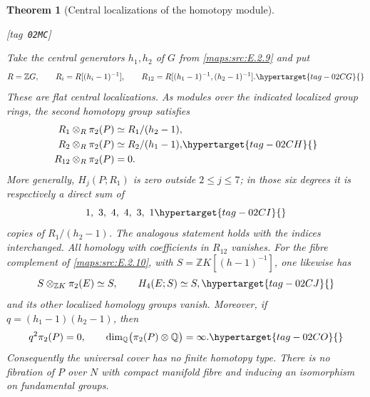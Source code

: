 \documentclass[11pt,a4paper]{article}
\numberwithin{equation}{section}
\newtheorem{theorem}{Theorem}[section]
\theoremstyle{definition}
\newcommand{\StatementRecord}[4]{{\upshape\footnotesize[tag~\texttt{#3}]}\enspace\ignorespaces}
\begin{document}
\begin{theorem}[Central localizations of the homotopy module]\hypertarget{tag-02MC}{}\label{maps:src:E.2.12}
\StatementRecord{maps:src:E.2.12}{proved}{02MC}{\cref{maps:src:E.2.9}, \cref{maps:src:E.2.10}, \eqref{maps:eq:E.S17}, \cref{maps:src:E.2.3}, \eqref{maps:eq:E.S19}, \eqref{maps:eq:E.S21}, \cref{maps:src:E.2.11}}


Take the central generators $h_1,h_2$ of $G$ from \ref{maps:src:E.2.9} and put
\begin{equation}
 R=\mathbb ZG,\qquad R_i=R[(h_i-1)^{-1}],\qquad
              R_{12}=R[(h_1-1)^{-1},(h_2-1)^{-1}].
 \hypertarget{tag-02CG}{}\label{maps:eq:E.S13}
\end{equation}
These are flat central localizations. As modules over the indicated
localized group rings, the second homotopy group satisfies
\begin{equation}
 \begin{split}
 R_1\otimes_R\pi_2(P)&\simeq R_1/(h_2-1),\\
 R_2\otimes_R\pi_2(P)&\simeq R_2/(h_1-1),\\
 R_{12}\otimes_R\pi_2(P)&=0.
 \end{split}
 \hypertarget{tag-02CH}{}\label{maps:eq:E.S14}
\end{equation}
More generally, $H_j(P;R_1)$ is zero outside $2\leq j\leq7$;
in those six degrees it is respectively a direct sum of
\begin{equation}
                  1,\ 3,\ 4,\ 4,\ 3,\ 1
 \hypertarget{tag-02CI}{}\label{maps:eq:E.S15}
\end{equation}
copies of $R_1/(h_2-1)$. The analogous statement holds with the
indices interchanged. All homology with coefficients in $R_{12}$
vanishes. For the fibre complement of \ref{maps:src:E.2.10}, with
$S=\mathbb ZK[(h-1)^{-1}]$, one likewise has
\begin{equation}
             S\otimes_{\mathbb ZK}\pi_2(E)\simeq S,
       \qquad H_4(E;S)\simeq S,
 \hypertarget{tag-02CJ}{}\label{maps:eq:E.S16}
\end{equation}
and its other localized homology groups vanish. Moreover, if
$q=(h_1-1)(h_2-1)$, then
\begin{equation}
                  q^2\pi_2(P)=0,
        \qquad \dim_{\mathbb Q}\bigl(\pi_2(P)\otimes\mathbb Q\bigr)
                     =\infty.
 \hypertarget{tag-02CO}{}\label{maps:eq:E.S20}
\end{equation}
Consequently the universal cover has no finite homotopy type.
There is no fibration of $P$ over $N$ with compact manifold fibre
and inducing an isomorphism on fundamental groups.

\end{theorem}
\end{document}
